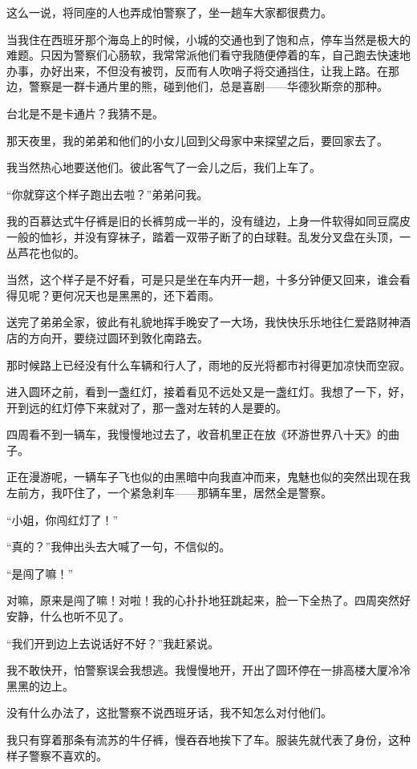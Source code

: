\par 这么一说，将同座的人也弄成怕警察了，坐一趟车大家都很费力。
\par 当我住在西班牙那个海岛上的时候，小城的交通也到了饱和点，停车当然是极大的难题。只因为警察们心肠软，我常常派他们看守我随便停着的车，自己跑去快速地办事，办好出来，不但没有被罚，反而有人吹哨子将交通挡住，让我上路。在那边，警察是一群卡通片里的熊，碰到他们，总是喜剧——华德狄斯奈的那种。
\par 台北是不是卡通片？我猜不是。
\par 那天夜里，我的弟弟和他们的小女儿回到父母家中来探望之后，要回家去了。
\par 我当然热心地要送他们。彼此客气了一会儿之后，我们上车了。
\par “你就穿这个样子跑出去啦？”弟弟问我。
\par 我的百慕达式牛仔裤是旧的长裤剪成一半的，没有缝边，上身一件软得如同豆腐皮一般的恤衫，并没有穿袜子，踏着一双带子断了的白球鞋。乱发分叉盘在头顶，一丛芦花也似的。
\par 当然，这个样子是不好看，可是只是坐在车内开一趟，十多分钟便又回来，谁会看得见呢？更何况天也是黑黑的，还下着雨。
\par 送完了弟弟全家，彼此有礼貌地挥手晚安了一大场，我快快乐乐地往仁爱路财神酒店的方向开，要绕过圆环到敦化南路去。
\par 那时候路上已经没有什么车辆和行人了，雨地的反光将都市衬得更加凉快而空寂。
\par 进入圆环之前，看到一盏红灯，接着看见不远处又是一盏红灯。我想了一下，好，开到远的红灯停下来就对了，那一盏对左转的人是要的。
\par 四周看不到一辆车，我慢慢地过去了，收音机里正在放《环游世界八十天》的曲子。
\par 正在漫游呢，一辆车子飞也似的由黑暗中向我直冲而来，鬼魅也似的突然出现在我左前方，我吓住了，一个紧急刹车——那辆车里，居然全是警察。
\par “小姐，你闯红灯了！”
\par “真的？”我伸出头去大喊了一句，不信似的。
\par “是闯了嘛！”
\par 对嘛，原来是闯了嘛！对啦！我的心扑扑地狂跳起来，脸一下全热了。四周突然好安静，什么也听不见了。
\par “我们开到边上去说话好不好？”我赶紧说。
\par 我不敢快开，怕警察误会我想逃。我慢慢地开，开出了圆环停在一排高楼大厦冷冷黑黑的边上。
\par 没有什么办法了，这批警察不说西班牙话，我不知怎么对付他们。
\par 我只有穿着那条有流苏的牛仔裤，慢吞吞地挨下了车。服装先就代表了身份，这种样子警察不喜欢的。
